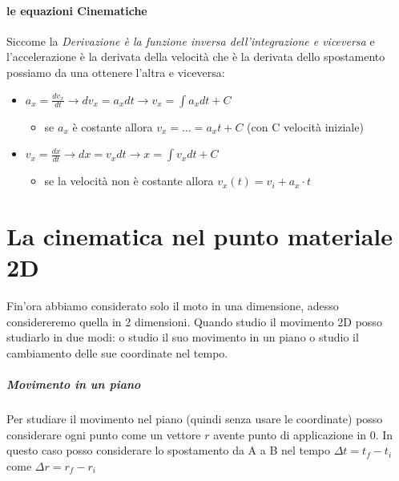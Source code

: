\documentclass[12pt, a4paper, openany]{book}
\begin{document}
\paragraph*{le equazioni Cinematiche}
Siccome la \emph{Derivazione è la funzione inversa dell'integrazione e viceversa} e l'accelerazione è la derivata della velocità che è la derivata dello spostamento
possiamo da una ottenere l'altra e viceversa:
\begin{itemize} %
    \item $a_x = \frac{dv_x}{dt} \to dv_x = a_xdt \to v_x = \int a_x dt + C$
          \begin{itemize}
              \item se $a_x$ è costante allora $v_x = ... = a_x t + C$ (con C velocità iniziale)
          \end{itemize}
    \item $v_x = \frac{dx}{dt} \to dx = v_xdt \to x = \int v_xdt + C$
          \begin{itemize}
              \item se la velocità non è costante allora $v_x(t) = v_i + a_x \cdot t$
          \end{itemize}
\end{itemize}
\section*{La cinematica nel punto materiale 2D}
Fin'ora abbiamo considerato solo il moto in una dimensione, adesso considereremo quella in 2 dimensioni.
Quando studio il movimento 2D posso studiarlo in due modi: o studio il suo movimento in un piano o studio il cambiamento delle sue coordinate nel tempo.
\subparagraph*{Movimento in un piano} Per studiare il movimento nel piano (quindi senza usare le coordinate) posso considerare ogni
punto come un vettore $r$ avente punto di applicazione in 0.
In questo caso posso considerare lo spostamento da A a B nel tempo $\Delta t = t_f-t_i$ come $\Delta r = r_f-r_i$
\end{document}
